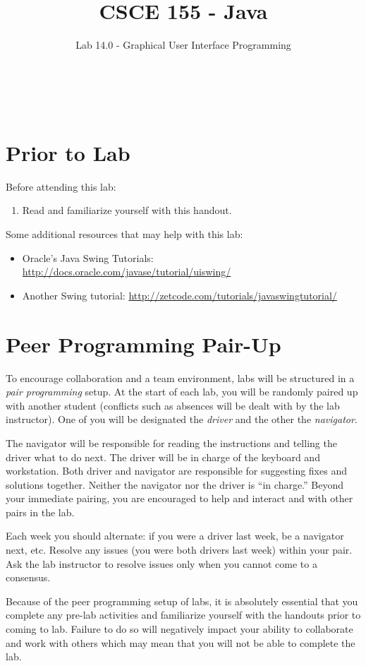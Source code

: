 \documentclass[12pt]{scrartcl}
\title{CSCE 155 - Java}
\subtitle{Lab 14.0 - Graphical User Interface Programming}
\author{~}
\date{~}
\begin{document}
\maketitle

\section*{Prior to Lab}

Before attending this lab:
\begin{enumerate}
  \item Read and familiarize yourself with this handout.
\end{enumerate}

Some additional resources that may help with this lab:
\begin{itemize}
  \item Oracle's Java Swing Tutorials:\\
	\url{http://docs.oracle.com/javase/tutorial/uiswing/}
  \item Another Swing tutorial:
	\url{http://zetcode.com/tutorials/javaswingtutorial/}
\end{itemize}

\section*{Peer Programming Pair-Up}

To encourage collaboration and a team environment, labs will be
structured in a \emph{pair programming} setup.  At the start of
each lab, you will be randomly paired up with another student 
(conflicts such as absences will be dealt with by the lab instructor).
One of you will be designated the \emph{driver} and the other
the \emph{navigator}.  

The navigator will be responsible for reading the instructions and
telling the driver what to do next.  The driver will be in charge of the
keyboard and workstation.  Both driver and navigator are responsible
for suggesting fixes and solutions together.  Neither the navigator
nor the driver is ``in charge.''  Beyond your immediate pairing, you
are encouraged to help and interact and with other pairs in the lab.

Each week you should alternate: if you were a driver last week, 
be a navigator next, etc.  Resolve any issues (you were both drivers
last week) within your pair.  Ask the lab instructor to resolve issues
only when you cannot come to a consensus.  

Because of the peer programming setup of labs, it is absolutely 
essential that you complete any pre-lab activities and familiarize
yourself with the handouts prior to coming to lab.  Failure to do
so will negatively impact your ability to collaborate and work with 
others which may mean that you will not be able to complete the
lab.  
\end{document}
